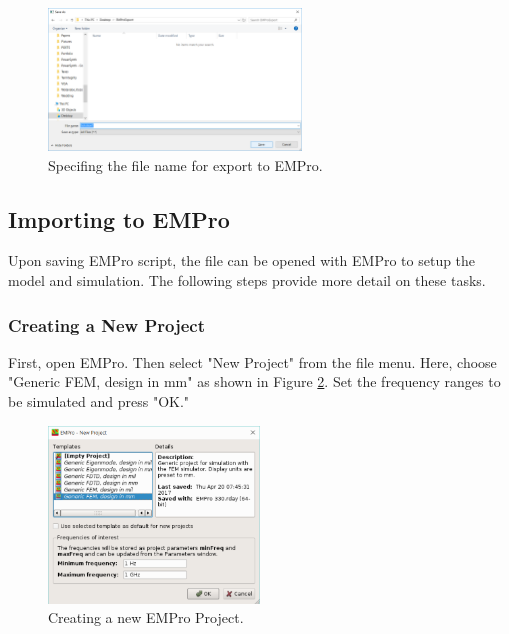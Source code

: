 \documentclass[11pt]{article}
\begin{document}
\begin{figure}[htb]
\centering
\includegraphics[width=0.6\textwidth]{./figs/empro/03_PyFileSave.PNG}
\caption{\label{fig:save-py}Specifing the file name for export to EMPro.}
\end{figure}



\subsection{Importing to EMPro}
\label{sec-5-3}

Upon saving EMPro script, the file can be opened with EMPro to setup the model and simulation. The following steps provide more detail on these tasks.

\subsubsection{Creating a New Project}
\label{sec-5-3-1}

First, open EMPro. Then select "New Project" from the file menu. Here, choose "Generic FEM, design in mm" as shown in Figure \ref{fig:new-proj}. Set the frequency ranges to be simulated and press "OK."


\begin{figure}[htb]
\centering
\includegraphics[width=0.5\textwidth]{./figs/empro/04_NewProject.PNG}
\caption{\label{fig:new-proj}Creating a new EMPro Project.}
\end{figure}
\end{document}
